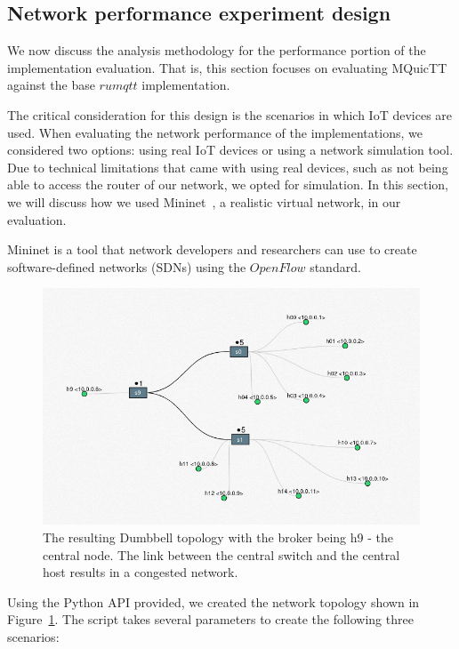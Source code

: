 \subsection{Network performance experiment design} \label{chap:net_sim}

We now discuss the analysis methodology for the performance portion of the implementation evaluation.
That is, this section focuses on evaluating MQuicTT against the base $rumqtt$ implementation.

The critical consideration for this design is the scenarios in which IoT devices are used.
When evaluating the network performance of the implementations, we considered two options: using real IoT devices or using a network simulation tool.
Due to technical limitations that came with using real devices, such as not being able to access the router of our network, we opted for simulation.
In this section, we will discuss how we used Mininet~\citep{lantz_mininet_2021}, a realistic virtual network, in our evaluation.

Mininet is a tool that network developers and researchers can use to create software-defined networks (SDNs) using the $OpenFlow$ standard.

\begin{figure}[ht]
    \centering
    \includegraphics[width=0.9\linewidth]{images/mininet_topo.png}
    \caption{The resulting Dumbbell topology with the broker being h9 - the central node. The link between the central switch and the central host results in a congested network.}
    \label{fig:mininet-topo}
\end{figure}

Using the Python API provided, we created the network topology shown in Figure~\ref{fig:mininet-topo}.
The script takes several parameters to create the following three scenarios:


